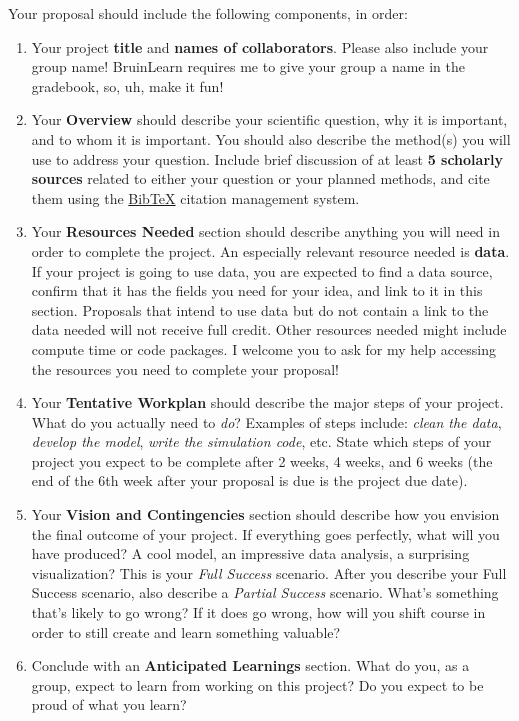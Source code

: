 \documentclass{hw}
\begin{document}
Your proposal should include the following components, in order:
\begin{enumerate}
    \item Your project \textbf{title} and \textbf{names of collaborators}. 
    Please also include your group name! 
    BruinLearn requires me to give your group a name in the gradebook, so, uh, make it fun! 
    \item Your \textbf{Overview} should describe your scientific question, why it is important, and to whom it is important. 
    You should also describe the method(s) you will use to address your question. 
    Include brief discussion of at least \textbf{5 scholarly sources} related to either your question or your planned methods, and cite them using the \href{https://www.overleaf.com/learn/latex/Bibliography_management_with_bibtex}{Bib\TeX} citation management system. 
    \item Your \textbf{Resources Needed} section should describe anything you will need in order to complete the project. 
    An especially relevant resource needed is \textbf{data}. 
    If your project is going to use data, you are expected to find a data source, confirm that it has the fields you need for your idea, and link to it in this section. 
    Proposals that intend to use data but do not contain a link to the data needed will not receive full credit. 
    Other resources needed might include compute time or code packages. 
    I welcome you to ask for my help accessing the resources you need to complete your proposal! 
    \item Your \textbf{Tentative Workplan} should describe the major steps of your project. 
    What do you actually need to \emph{do}? 
    Examples of steps include: \emph{clean the data}, \emph{develop the model}, \emph{write the simulation code}, etc. 
    State which steps of your project you expect to be complete after 2 weeks, 4 weeks, and 6 weeks (the end of the 6th week after your proposal is due is the project due date). 
    \item Your \textbf{Vision and Contingencies} section should describe how you envision the final outcome of your project. 
    If everything goes perfectly, what will you have produced? 
    A cool model, an impressive data analysis, a surprising visualization? 
    This is your \emph{Full Success} scenario. 
    After you describe your Full Success scenario, also describe a \emph{Partial Success} scenario. 
    What's something that's likely to go wrong? 
    If it does go wrong, how will you shift course in order to still create and learn something valuable? 
    \item Conclude with an  \textbf{Anticipated Learnings} section. 
    What do you, as a group, expect to learn from working on this project? 
    Do you expect to be proud of what you learn? 
\end{enumerate}
\end{document}
